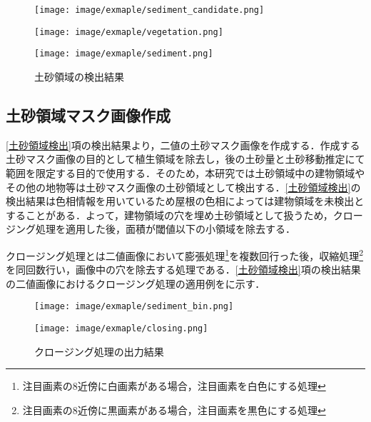       \begin{figure}[t]
        \begin{minipage}[c]{0.329\hsize}
          \centering
          \texttt{[image: image/exmaple/sediment\_candidate.png]}
        \end{minipage}
        \begin{minipage}[c]{0.329\hsize}
          \centering
          \texttt{[image: image/exmaple/vegetation.png]}
        \end{minipage}
        \begin{minipage}[c]{0.329\hsize}
          \centering
          \texttt{[image: image/exmaple/sediment.png]}
        \end{minipage}
        \caption{土砂領域の検出結果}
        \label{土砂領域検出結果}
      \end{figure}


    \subsection{土砂領域マスク画像作成}
      \ref{土砂領域検出}項の検出結果より，二値の土砂マスク画像を作成する．作成する土砂マスク画像の目的として植生領域を除去し，後の土砂量と土砂移動推定にて範囲を限定する目的で使用する．そのため，本研究では土砂領域中の建物領域やその他の地物等は土砂マスク画像の土砂領域として検出する．\ref{土砂領域検出}の検出結果は色相情報を用いているため屋根の色相によっては建物領域を未検出とすることがある．よって，建物領域の穴を埋め土砂領域として扱うため，クロージング処理を適用した後，面積が閾値以下の小領域を除去する．
      
      クロージング処理とは二値画像において膨張処理\footnote{注目画素の8近傍に白画素がある場合，注目画素を白色にする処理}を複数回行った後，収縮処理\footnote{注目画素の8近傍に黒画素がある場合，注目画素を黒色にする処理}を同回数行い，画像中の穴を除去する処理である．\ref{土砂領域検出}項の検出結果の二値画像におけるクロージング処理の適用例をに示す．

      \begin{figure}[t]
        \begin{minipage}[c]{0.45\hsize}
          \centering
          \texttt{[image: image/exmaple/sediment\_bin.png]}
        \end{minipage}
        \begin{minipage}[c]{0.45\hsize}
          \centering
          \texttt{[image: image/exmaple/closing.png]}
        \end{minipage}
        \caption{クロージング処理の出力結果}
        \label{クロージング処理}
      \end{figure}

